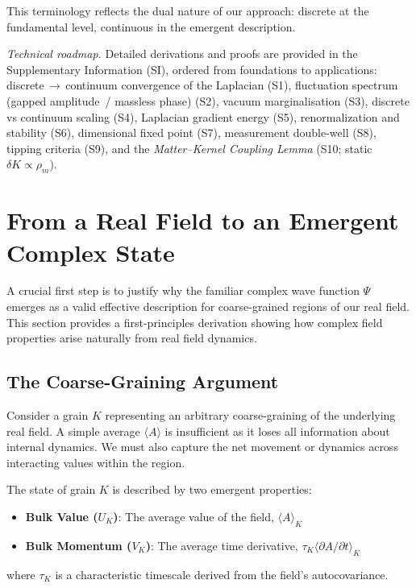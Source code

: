 \documentclass[11pt]{article}
\begin{document}
This terminology reflects the dual nature of our approach: discrete at the fundamental level, continuous in the emergent description.

\noindent\textit{Technical roadmap.} Detailed derivations and proofs are provided in the Supplementary Information (SI), ordered from foundations to applications: discrete\,$\to$\,continuum convergence of the Laplacian (S1), fluctuation spectrum (gapped amplitude \,/ massless phase) (S2), vacuum marginalisation (S3), discrete vs continuum scaling (S4), Laplacian gradient energy (S5), renormalization and stability (S6), dimensional fixed point (S7), measurement double-well (S8), tipping criteria (S9), and the \emph{Matter--Kernel Coupling Lemma} (S10; static $\delta K\propto\rho_m$).

\section{From a Real Field to an Emergent Complex State}

A crucial first step is to justify why the familiar complex wave function $\Psi$ emerges as a valid effective description for coarse-grained regions of our real field. This section provides a first-principles derivation showing how complex field properties arise naturally from real field dynamics.

\subsection{The Coarse-Graining Argument}

Consider a grain $K$ representing an arbitrary coarse-graining of the underlying real field. A simple average $\langle A\rangle$ is insufficient as it loses all information about internal dynamics. We must also capture the net movement or dynamics across interacting values within the region.

The state of grain $K$ is described by two emergent properties:

\begin{itemize}
\item \textbf{Bulk Value ($U_K$)}: The average value of the field, $\langle A\rangle_K$
\item \textbf{Bulk Momentum ($V_K$)}: The average time derivative, $\tau_K\langle\partial A/\partial t\rangle_K$
\end{itemize}

where $\tau_K$ is a characteristic timescale derived from the field's autocovariance.
\end{document}
